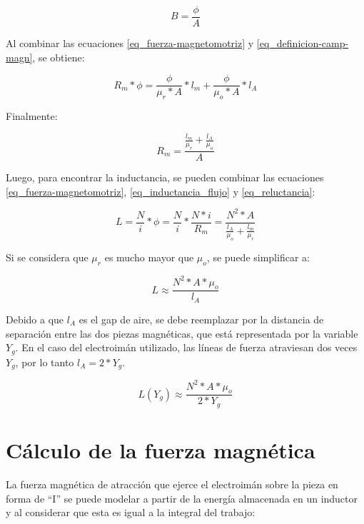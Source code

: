 \begin{equation}\label{eq_definicion-camp-magn}
	B=\frac{\phi}{A}
\end{equation}

Al combinar las ecuaciones \ref{eq_fuerza-magnetomotriz} y \ref{eq_definicion-camp-magn}, se obtiene:

\begin{equation}
		R_{m}*\phi=\frac{\phi}{\mu_{r}*A}*l_{m}+\frac{\phi}{\mu_{o}*A}*l_{A}
\end{equation}

\noindent Finalmente:

\begin{equation} \label{eq_reluctancia}
	R_{m}=\frac{\frac{l_{m}}{\mu_{r}}+\frac{l_{A}}{\mu_{o}}}{A}
\end{equation}

\noindent Luego, para encontrar la inductancia, se pueden combinar las ecuaciones  \ref{eq_fuerza-magnetomotriz}, \ref{eq_inductancia_flujo} y \ref{eq_reluctancia}:

\begin{equation}\label{eq_inductancia_2}
	L=\frac{N}{i}*\phi=\frac{N}{i}*\frac{N*i}{R_{m}}=\frac{N^{2}*A}{\frac{l_{A}}{\mu_{o}}+\frac{l_{m}}{\mu_{r}}}
\end{equation}

\noindent Si se considera que $\mu_{r}$ es mucho mayor que $\mu_{o}$, se puede simplificar a:

\begin{equation} \label{eq_inductancia_gap}
	L\approx\frac{N^{2}*A*\mu_{o}}{l_{A}}
\end{equation}

\noindent \noindent Debido a que $l_{A}$ es el gap de aire, se debe reemplazar por la distancia de separación entre las dos piezas magnéticas, que está representada por la variable $Y_{g}$. En el caso del electroimán utilizado, las líneas de fuerza atraviesan dos veces $Y_{g}$, por lo tanto $l_{A}=2*Y_{g}$.


\begin{equation}\label{eq_inductancia_vs_y}
		L(Y_g)\approx\frac{{N^{2}*A*\mu_{o}}}{2*Y_{g}}
\end{equation}

\section{Cálculo de la fuerza magnética}

\noindent La fuerza magnética de atracción que ejerce el electroimán sobre la pieza en forma de ``I'' se puede modelar a partir de la energía almacenada en un inductor y al considerar que esta es igual a la integral del trabajo:
\noindent

